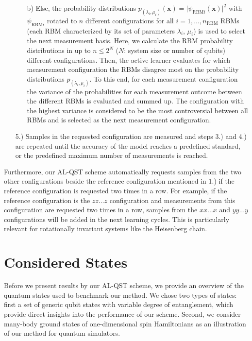 \documentclass[pra,aps,showpacs,groupedaddress,superscriptaddress,twocolumn,toc=flat,biblatex,footinbib]{revtex4-1}
\renewcommand{\vec}[1]{\bm{#1}}
\begin{document}
\begin{itemize}
\begin{itemize}
        \item [b)] Else, the probability distributions $p_{(\lambda_i, \mu_i)}(\vec{x})=\vert \psi_{\mathrm{RBM}i}(\vec{x})\vert ^2$ with $\psi_{\mathrm{RBM}i}$ rotated to $n$ different configurations for all $i = 1, \dots, n_{\mathrm{RBM}}$ RBMs (each RBM characterized by its set of parameters $\lambda_i, \, \mu_i $) is used to select the next measurement basis. Here, we calculate the RBM probability distributions in up to $n\leq 2^N$ ($N$: system size or number of qubits) different configurations. Then, the active learner evaluates for which measurement configuration the RBMs disagree most on the probability distributions $p_{(\lambda_i, \mu_i)}$. To this end, for each measurement configuration the variance of the probabilities for each measurement outcome between the different RBMs is evaluated and summed up. The configuration with the highest variance is considered to be the most controversial between all RBMs and is selected as the next measurement configuration.
    \end{itemize} 
    \item[5.)] Samples in the requested configuration are measured and steps 3.) and 4.) are repeated until the accuracy of the model reaches a predefined standard, or the predefined maximum number of measurements is reached.
\end{itemize}
Furthermore, our AL-QST scheme automatically requests samples from the two other configurations beside the reference configuration mentioned in 1.) if the reference configuration is requested two times in a row. For example, if the reference configuration is the $zz\dots z$ configuration and measurements from this configuration are requested two times in a row, samples from the $xx\dots x$ and $yy\dots y$ configurations will be added in the next learning cycles. This is particularly relevant for rotationally invariant systems like the Heisenberg chain.

\section{Considered States \label{sec:States}}
Before we present results by our AL-QST scheme, we provide an overview of the quantum states used to benchmark our method. We chose two types of states: first a set of generic qubit states with variable degree of entanglement, which provide direct insights into the performance of our scheme. Second, we consider many-body ground states of one-dimensional spin Hamiltonians as an illustration of our method for quantum simulators. 
\end{document}
